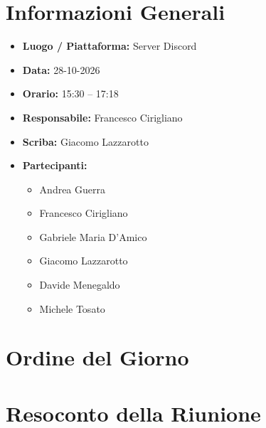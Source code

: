 \documentclass[11pt, a4paper]{article}
\newcommand{\DocDate}{28-10-2026}
\begin{document}
\section{Informazioni Generali}
\begin{itemize}
    \item \textbf{Luogo / Piattaforma:} Server Discord
    \item \textbf{Data:} \DocDate
    \item \textbf{Orario:} 15:30 -- 17:18
    \item \textbf{Responsabile:} Francesco Cirigliano
    \item \textbf{Scriba:} Giacomo Lazzarotto
    \item \textbf{Partecipanti:}
        \begin{itemize}
            \item Andrea Guerra
            \item Francesco Cirigliano
            \item Gabriele Maria D'Amico
            \item Giacomo Lazzarotto
            \item Davide Menegaldo
            \item Michele Tosato
        \end{itemize}
\end{itemize}
\clearpage
\section{Ordine del Giorno}
\begin{itemize}

\end{itemize}

\section{Resoconto della Riunione}
\end{document}
